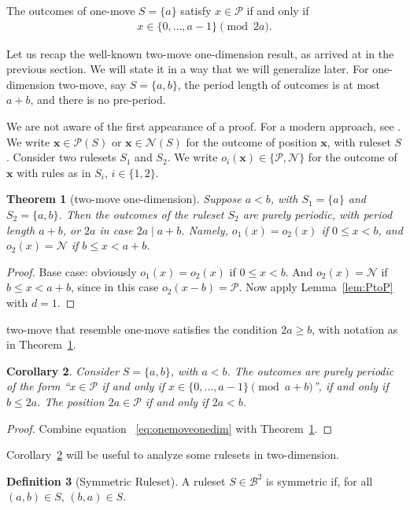 \documentclass{amsart}
\theoremstyle{plain}
\newtheorem{thm}{Theorem}%
\newtheorem{cor}[thm]{Corollary}
\theoremstyle{definition}
\newtheorem{defi}[thm]{Definition}
\newcommand{\N}{\ensuremath{\mathcal N}}
\renewcommand{\P}{\ensuremath{\mathcal P}}
\newcommand{\B}{\mathcal B}
\newcommand{\x}{\boldsymbol x}
\renewcommand{\ge}{\geqslant}
\renewcommand{\le}{\leqslant}
\begin{document}
The outcomes of {\sc one-move} $S=\{a\}$ satisfy $x\in\P$ if and only if 
    \begin{align}\label{eq:onemoveonedim}
    x\in \{0,\ldots , a-1\} \pmod{2a}.
    \end{align}

Let us recap the well-known {\sc two-move one-dimension} result, as arrived at in the previous section. We will state it in a way that we will generalize later. 
For {\sc one-dimension two-move}, say $S=\{a,b\}$, the period length of outcomes is at most $a+b$, and there is no pre-period.  

We are not aware of the first appearance of a proof. For a modern approach, see \cite{coleman2020department}. 
We write $\x\in\P(S)$ or $\x\in\N(S)$ for the outcome of position $\x$, with ruleset $S$. Consider two rulesets $S_1$ and $S_2$. We write $o_i(\x)\in \{\P,\N\}$ for the outcome of $\x$ with rules as in $S_i$, $i\in\{1,2\}$. 

\begin{thm}[{\sc two-move one-dimension}]\label{thm:twomoveonedim}
Suppose $a<b$, with $S_1=\{a\}$ and $S_2=\{a,b\}$. Then the outcomes of the ruleset $S_2$ are purely periodic, with period length $a+b$, or $2a$ in case $2a\mid a+b$. Namely,  $o_1(x)=o_2(x)$ if $0\le x<b$, and $o_2(x)=\N$ if $b\le x<a+b$. 
\end{thm}
\begin{proof}
Base case: obviously $o_1(x)=o_2(x)$ if $0\le x<b$. And $o_2(x)=\N$ if $b\le x<a+b$, since in this case $o_2(x-b)=\P$. Now apply Lemma~\ref{lem:PtoP} with $d=1$.
\end{proof}
{\sc two-move} that resemble {\sc one-move} satisfies the condition $2a\ge b$, with notation as in Theorem~\ref{thm:twomoveonedim}. 

    \begin{cor}\label{cor:onedim}
    Consider $S = \{a,b\}$, with $a<b$. The outcomes are purely periodic of the form ``$x\in\P$ if and only if $x\in \{0,\ldots , a-1\} \pmod{a+b}$'', if and only if $ b\le 2a$. The position $2a\in \P$ if and only if $2a<b$.
     
    \end{cor}
    \begin{proof}
        Combine equation~ \eqref{eq:onemoveonedim} with Theorem~\ref{thm:twomoveonedim}.
    \end{proof}

Corollary~\ref{cor:onedim} will be useful to analyze some rulesets in {\sc two-dimension}.
\begin{defi}[Symmetric Ruleset]
\label{def:sym}
A ruleset $S\in \B^2$ is symmetric if, for all $(a,b)\in S$, $(b,a)\in S$. 
\end{defi}
\end{document}
